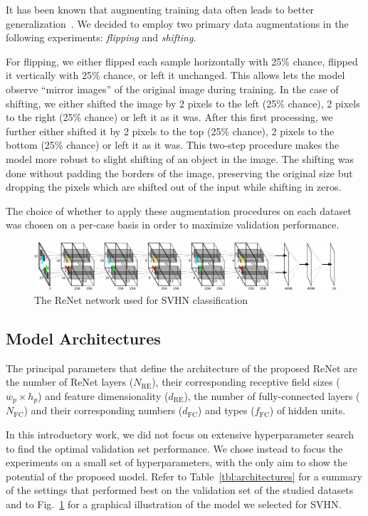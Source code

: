 It has been known that augmenting training data often leads to better
generalization~\citep[see, e.g.,][]{Krizhevsky-2012}. We decided to employ
two primary data augmentations in the following experiments: {\it flipping} and
{\it shifting}.

For flipping, we either flipped each sample horizontally with 25\% chance,
flipped it vertically with 25\% chance, or left it unchanged. This allows lets
the model observe ``mirror images'' of the original image during training.
In the case of shifting, we either shifted the image by 2 pixels to the left
(25\% chance), 2 pixels to the right (25\% chance) or left it as it was. After
this first processing, we further either shifted it by 2 pixels to the top
(25\% chance), 2 pixels to the bottom (25\% chance) or left it as it was. This
two-step procedure makes the model more robust to slight shifting of an object
in the image. The shifting was done without padding the borders of the image,
preserving the original size but dropping the pixels which are shifted out of
the input while shifting in zeros.

The choice of whether to apply these augmentation procedures on each dataset was
chosen on a per-case basis in order to maximize validation performance.

\begin{figure}[t]
    \centering
    \includegraphics[height=.135\textheight,width=\columnwidth]{pdf/renet_svhn.pdf}
    \caption{The ReNet network used for SVHN classification}
    \label{fig:network}
\end{figure}

\subsection{Model Architectures}

The principal parameters that define the architecture of the proposed ReNet are
the number of ReNet layers ($N_{\text{RE}}$), their corresponding receptive field
sizes ($w_p \times h_p$) and feature dimensionality ($d_{\text{RE}}$),
the number of fully-connected layers ($N_{\text{FC}}$) and their corresponding
numbers ($d_{\text{FC}}$) and types ($f_{\text{FC}}$) of hidden units.

In this introductory work, we did not focus on extensive hyperparameter
search to find the optimal validation set
performance. We chose instead to focus the experiments on a small set of
hyperparameters, with the only aim to show the potential of the proposed model.
Refer to Table~\ref{tbl:architectures} for a summary of the settings that performed
best on the validation set of the studied datasets and to Fig.~\ref{fig:network}
for a graphical illustration of the model we selected for SVHN.

